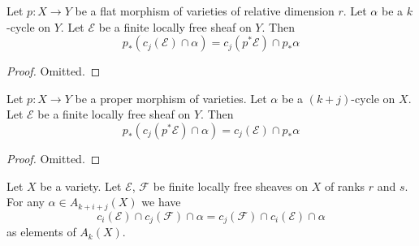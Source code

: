 \begin{lemma}
\label{lemma-flat-pushback-cap-cj}
Let $p : X \to Y$ be a flat morphism of varieties of relative dimension $r$.
Let $\alpha$ be a $k$-cycle on $Y$.
Let $\mathcal{E}$ be a finite locally free sheaf on $Y$.
Then
$$
p_*(c_j(\mathcal{E}) \cap \alpha) = c_j(p^*\mathcal{E}) \cap p_*\alpha
$$
\end{lemma}

\begin{proof}
Omitted.
\end{proof}

\begin{lemma}
\label{lemma-pushforward-cap-cj}
Let $p : X \to Y$ be a proper morphism of varieties.
Let $\alpha$ be a $(k + j)$-cycle on $X$.
Let $\mathcal{E}$ be a finite locally free sheaf on $Y$.
Then
$$
p_*(c_j(p^*\mathcal{E}) \cap \alpha) = c_j(\mathcal{E}) \cap p_*\alpha
$$
\end{lemma}

\begin{proof}
Omitted.
\end{proof}

\begin{lemma}
\label{lemma-cap-commutative-chern}
Let $X$ be a variety.
Let $\mathcal{E}$, $\mathcal{F}$ be finite locally free sheaves on $X$
of ranks $r$ and $s$.
For any $\alpha \in A_{k + i + j}(X)$ we have
$$
c_i(\mathcal{E}) \cap c_j(\mathcal{F}) \cap \alpha
=
c_j(\mathcal{F}) \cap c_i(\mathcal{E}) \cap \alpha
$$
as elements of $A_k(X)$.
\end{lemma}

